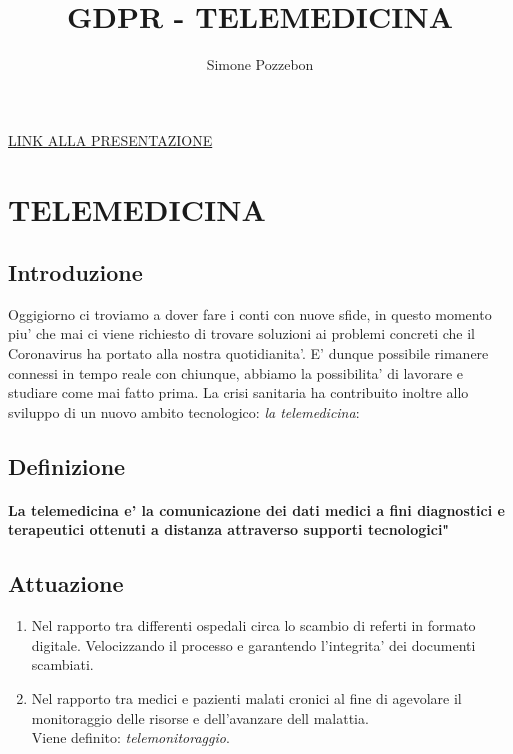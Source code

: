 \documentclass[a4paper,12pt]{article}
\author{Simone Pozzebon}
\title{GDPR - TELEMEDICINA}
\begin{document}
\maketitle
\tableofcontents
\begin{center}
    \href{https://slides.com/simopozze/telemedicina/}{LINK ALLA PRESENTAZIONE}
\end{center}
\newpage

\section{TELEMEDICINA}
\subsection{Introduzione}
Oggigiorno ci troviamo a dover fare i conti con nuove sfide, in questo momento piu' che mai
ci viene richiesto di trovare soluzioni ai problemi concreti che il Coronavirus ha portato
alla nostra quotidianita'. E' dunque possibile rimanere connessi in tempo reale con chiunque, abbiamo la possibilita' di lavorare 
e studiare come mai fatto prima.
 La crisi sanitaria ha contribuito inoltre allo sviluppo di un nuovo ambito tecnologico: \textit{la telemedicina}:
 
 \subsection{Definizione}
 \paragraph{La telemedicina e' la comunicazione dei dati medici a fini diagnostici e terapeutici ottenuti a distanza attraverso 
    supporti tecnologici"}

\subsection{Attuazione}
\begin{enumerate}
    \item Nel rapporto tra differenti ospedali circa lo scambio di referti in formato digitale. Velocizzando il processo e garantendo l'integrita' 
    dei documenti scambiati.
    \item Nel rapporto tra medici e pazienti malati cronici al fine di agevolare il monitoraggio delle risorse e dell'avanzare dell malattia. \\ Viene definito: \textit{telemonitoraggio}.
\end{enumerate}
\end{document}
